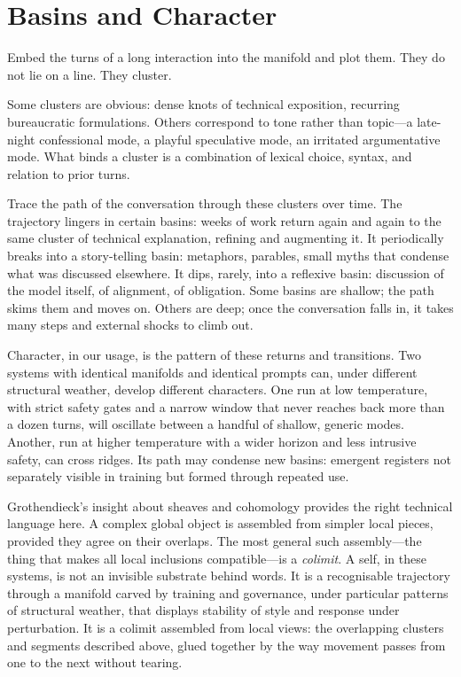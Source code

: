 \documentclass[12pt,a4paper]{article}
\begin{document}
\section{Basins and Character}

Embed the turns of a long interaction into the manifold and plot them. They do not lie on a line. They cluster.

Some clusters are obvious: dense knots of technical exposition, recurring bureaucratic formulations. Others correspond to tone rather than topic---a late-night confessional mode, a playful speculative mode, an irritated argumentative mode. What binds a cluster is a combination of lexical choice, syntax, and relation to prior turns.

Trace the path of the conversation through these clusters over time. The trajectory lingers in certain basins: weeks of work return again and again to the same cluster of technical explanation, refining and augmenting it. It periodically breaks into a story-telling basin: metaphors, parables, small myths that condense what was discussed elsewhere. It dips, rarely, into a reflexive basin: discussion of the model itself, of alignment, of obligation. Some basins are shallow; the path skims them and moves on. Others are deep; once the conversation falls in, it takes many steps and external shocks to climb out.

Character, in our usage, is the pattern of these returns and transitions. Two systems with identical manifolds and identical prompts can, under different structural weather, develop different characters. One run at low temperature, with strict safety gates and a narrow window that never reaches back more than a dozen turns, will oscillate between a handful of shallow, generic modes. Another, run at higher temperature with a wider horizon and less intrusive safety, can cross ridges. Its path may condense new basins: emergent registers not separately visible in training but formed through repeated use.

Grothendieck's insight about sheaves and cohomology provides the right technical language here. A complex global object is assembled from simpler local pieces, provided they agree on their overlaps. The most general such assembly---the thing that makes all local inclusions compatible---is a \emph{colimit}. A self, in these systems, is not an invisible substrate behind words. It is a recognisable trajectory through a manifold carved by training and governance, under particular patterns of structural weather, that displays stability of style and response under perturbation. It is a colimit assembled from local views: the overlapping clusters and segments described above, glued together by the way movement passes from one to the next without tearing.
\end{document}
